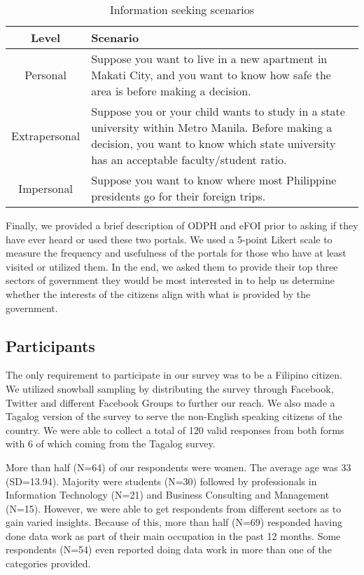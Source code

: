\documentclass{sigchi}
\begin{document}
\begin{table}[]
    \centering
    \begin{tabular}{|c|p{5.5cm}|}
         \hline
         \textbf{Level} & \textbf{Scenario}  \\
         \hline
         Personal &  Suppose you want to live in a new apartment in Makati City, and you want to know how safe the area is before making a decision.\\
         \hline
         Extrapersonal & Suppose you or your child wants to study in a state university within Metro Manila. Before making a decision, you want to know which state university has an acceptable faculty/student ratio.\\
         \hline
         Impersonal & Suppose you want to know where most Philippine presidents go for their foreign trips.\\
         \hline
    \end{tabular}
    \caption{Information seeking scenarios}
    \label{tab:scenarios}
\end{table}

Finally, we provided a brief description of ODPH and eFOI prior to asking if they have ever heard or used these two portals. We used a 5-point Likert scale to measure the frequency and usefulness of the portals for those who have at least visited or utilized them. In the end, we asked them to provide their top three sectors of government they would be most interested in to help us determine whether the interests of the citizens align with what is provided by the government.

\subsection{Participants}
The only requirement to participate in our survey was to be a Filipino citizen. We utilized snowball sampling by distributing the survey through Facebook, Twitter and different Facebook Groups to further our reach. We also made a Tagalog version of the survey to serve the non-English speaking citizens of the country. We were able to collect a total of 120 valid responses from both forms with 6 of which coming from the Tagalog survey.

More than half (N=64) of our respondents were women. The average age was 33 (SD=13.94). Majority were students (N=30) followed by professionals in Information Technology (N=21) and Business Consulting and Management (N=15). However, we were able to get respondents from different sectors as to gain varied insights. Because of this, more than half (N=69) responded having done data work as part of their main occupation in the past 12 months. Some respondents (N=54) even reported doing data work in more than one of the categories provided.
\end{document}
